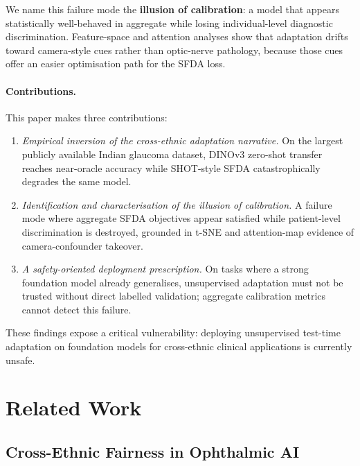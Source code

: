 \documentclass[11pt]{article}
\begin{document}
We name this failure mode the \textbf{illusion of calibration}: a model
that appears statistically well-behaved in aggregate while losing
individual-level diagnostic discrimination. Feature-space and attention
analyses show that adaptation drifts toward camera-style cues rather than
optic-nerve pathology, because those cues offer an easier optimisation path
for the SFDA loss.

\paragraph{Contributions.} This paper makes three contributions:
\begin{enumerate}[leftmargin=1.2em,topsep=2pt,itemsep=1pt]
  \item \emph{Empirical inversion of the cross-ethnic adaptation narrative.}
    On the largest publicly available Indian glaucoma dataset, DINOv3
    zero-shot transfer reaches near-oracle accuracy while SHOT-style SFDA
    catastrophically degrades the same model.
  \item \emph{Identification and characterisation of the illusion of
    calibration.} A failure mode where aggregate SFDA objectives appear
    satisfied while patient-level discrimination is destroyed, grounded in
    t-SNE and attention-map evidence of camera-confounder takeover.
  \item \emph{A safety-oriented deployment prescription.} On tasks where
    a strong foundation model already generalises, unsupervised adaptation
    must not be trusted without direct labelled validation; aggregate
    calibration metrics cannot detect this failure.
\end{enumerate}
These findings expose a critical vulnerability: deploying unsupervised
test-time adaptation on foundation models for cross-ethnic clinical
applications is currently unsafe.

\section{Related Work}
\label{sec:related}

\subsection{Cross-Ethnic Fairness in Ophthalmic AI}
\end{document}
